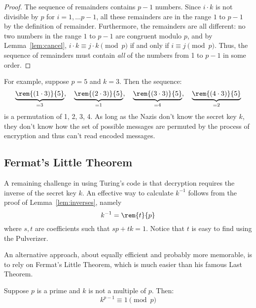 \begin{proof}
The sequence of remainders contains $p-1$ numbers.  Since $i \cdot k$
is not divisible by $p$ for $i=1,\dots p-1$, all these remainders are
in the range $1$ to $p - 1$ by the definition of remainder.
Furthermore, the remainders are all different: no two numbers in the
range $1$ to $p - 1$ are congruent modulo $p$, and by
Lemma~\ref{lem:cancel}, $i \cdot k \equiv j \cdot k \pmod{p}$ if and
only if $i \equiv j \pmod{p}$.  Thus, the sequence of remainders must
contain \emph{all} of the numbers from 1 to $p - 1$ in some order.
\end{proof}

For example, suppose $p = 5$ and $k = 3$.  Then the sequence:
%
\[
\underbrace{\rem{(1 \cdot 3)}{5}}_{=3},\quad
\underbrace{\rem{(2 \cdot 3)}{5}}_{=1},\quad
\underbrace{\rem{(3 \cdot 3)}{5}}_{=4},\quad
\underbrace{\rem{(4 \cdot 3)}{5}}_{=2}
\]
%
is a permutation of
1, 2, 3, 4.  As long as the Nazis don't know the secret key
$k$, they don't know how the set of possible messages are permuted by the
process of encryption and thus can't read encoded messages.


\subsection{Fermat's Little Theorem}

A remaining challenge in using Turing's code is that decryption requires
the inverse of the secret key $k$.  An effective way to calculate
$k^{-1}$ follows from the proof of Lemma~\ref{lem:inverses}, namely
\[
k^{-1} = \rem{t}{p}
\]
where $s,t$ are coefficients such that $sp+tk=1$.  Notice that $t$ is
easy to find using the Pulverizer.

An alternative approach, about equally efficient and probably more
memorable, is to rely on Fermat's Little Theorem, which is much easier than his
famous Last Theorem.  \iffalse ---and more useful.\fi

\begin{theorem}\label{fermat_little}
Suppose $p$ is a prime and $k$ is not a multiple of $p$.  Then:
%
\[
k^{p-1} \equiv 1 \pmod{p}
\]
\end{theorem}

